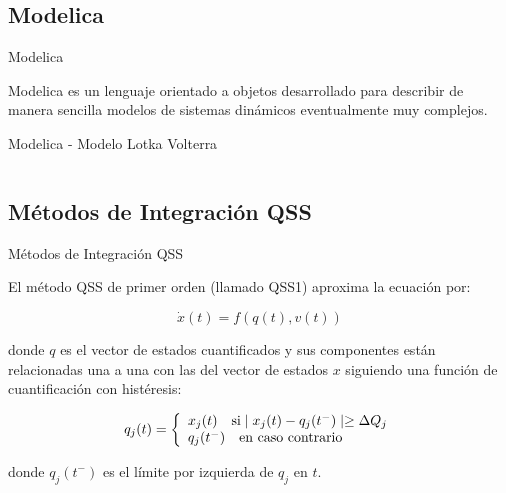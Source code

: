 \documentclass[10pt,handout]{beamer}
\begin{document}
	\subsection{Modelica}

\begin{frame}{Modelica}
	\begin{block}{Modelica}
es un lenguaje orientado a objetos desarrollado para describir de manera sencilla modelos de sistemas dinámicos eventualmente muy complejos.
	
\end{block}
\end{frame}

\begin{frame}[fragile]{Modelica - Modelo Lotka Volterra}
\begin{center}
\begin{figure}[H]    
	\inputminted[linenos]{modelica}{src/LotkaVolterra.mo}
\end{figure}
\end{center}
\end{frame}

	\subsection{Métodos de Integración QSS}

\begin{frame}{Métodos de Integración QSS}
\begin{block}{El método QSS}
	de primer orden (llamado QSS1) aproxima la ecuación por:
	
	\begin{equation*}
	\dot{x}(t) = f (q(t), v(t))
	\end{equation*}
	
	donde $q$ es el vector de estados cuantificados y sus componentes están relacionadas una a una con las del vector de estados $x$ siguiendo una 
	función de cuantificación con histéresis:
	
	\begin{equation*}
	q_j(t) = \left\{ 
	  \begin{array}{l l}
	    x_j(t)  \quad \text{si} \mid x_j (t ) - q_j (t^{-} ) \mid \geq \Delta Q_j \\
	    q_j (t^{-} ) \quad \text{en caso contrario}
	  \end{array} \right.
	\end{equation*}
	
	donde $q_j (t^{-})$ es el límite por izquierda de $q_j$ en $t$.
\end{block}
\end{frame}
\end{document}
